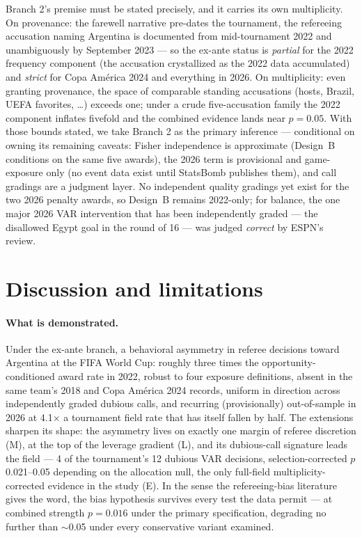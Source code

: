 \documentclass[11pt,a4paper]{article}
\newcommand{\pv}[1]{\ensuremath{p = #1}}
\begin{document}
Branch 2's premise must be stated precisely, and it carries its own multiplicity.
On provenance: the farewell narrative pre-dates the tournament, the refereeing
accusation naming Argentina is documented from mid-tournament 2022
\cite{modric2022} and unambiguously by September 2023 \cite{vangaal2023} --- so the
ex-ante status is \emph{partial} for the 2022 frequency component (the accusation
crystallized as the 2022 data accumulated) and \emph{strict} for Copa Am\'erica 2024
and everything in 2026. On multiplicity: even granting provenance, the space of
comparable standing accusations (hosts, Brazil, UEFA favorites, \ldots) exceeds one;
under a crude five-accusation family the 2022 component inflates fivefold and the
combined evidence lands near \pv{0.05}. With those bounds stated, we take Branch 2
as the primary inference --- conditional on owning its remaining caveats: Fisher
independence is approximate (Design~B
conditions on the same five awards), the 2026 term is provisional and game-exposure
only (no event data exist until StatsBomb publishes them), and call gradings are a
judgment layer. No independent quality gradings yet exist for the two 2026 penalty
awards, so Design~B remains 2022-only; for balance, the one major 2026 VAR
intervention that has been independently graded --- the disallowed Egypt goal in the
round of 16 --- was judged \emph{correct} by ESPN's review.

\section{Discussion and limitations}
\label{sec:discussion}

\paragraph{What is demonstrated.} Under the ex-ante branch, a behavioral asymmetry in
referee decisions toward Argentina at the FIFA World Cup: roughly three times the
opportunity-conditioned award rate in 2022, robust to four exposure definitions,
absent in the same team's 2018 and Copa Am\'erica 2024 records, uniform in direction
across independently graded dubious calls, and recurring (provisionally)
out-of-sample in 2026 at 4.1$\times$ a tournament field rate that has itself fallen
by half. The extensions sharpen its shape: the asymmetry lives on exactly one margin
of referee discretion (M), at the top of the leverage gradient (L), and its
dubious-call signature leads the field --- 4 of the tournament's 12 dubious
VAR decisions, selection-corrected $p$ 0.021--0.05 depending on the allocation null,
the only full-field multiplicity-corrected evidence in the study (E). In the sense
the refereeing-bias literature gives the word,
the bias hypothesis survives every test the data permit --- at combined strength
\pv{0.016} under the primary specification, degrading no further than $\sim$0.05
under every conservative variant examined.
\end{document}
